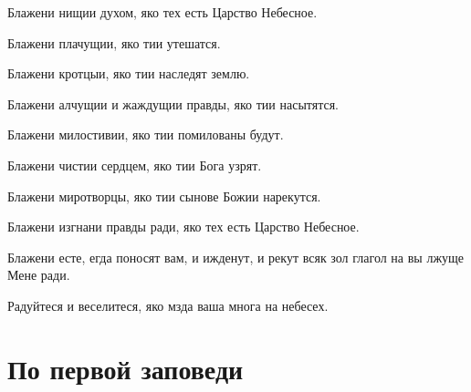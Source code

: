 \mychapterending

 


{\centering{}

}

Блажени нищии духом, яко тех есть Царство Небесное. 

Блажени плачущии, яко тии утешатся. 

Блажени кротцыи, яко тии наследят землю. 

Блажени алчущии и жаждущии правды, яко тии насытятся. 

Блажени милостивии, яко тии помилованы будут. 

Блажени чистии сердцем, яко тии Бога узрят. 

Блажени миротворцы, яко тии сынове Божии нарекутся. 

Блажени изгнани правды ради, яко тех есть Царство Небесное. 

Блажени есте, егда поносят вам, и ижденут, и рекут всяк зол глагол на вы лжуще Мене ради. 

Радуйтеся и веселитеся, яко мзда ваша многа на небесех. 

\mychapterending

 
\section{По первой заповеди}\nopagebreak

